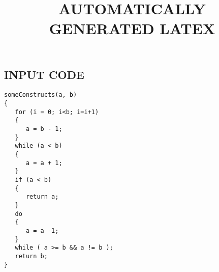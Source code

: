 \documentclass{article}
\begin{document}
\title{AUTOMATICALLY GENERATED LATEX}
\maketitle

\subsection{INPUT CODE}
\begin{lstlisting}
someConstructs(a, b)
{
   for (i = 0; i<b; i=i+1)
   {
      a = b - 1;
   }
   while (a < b)
   {
      a = a + 1;
   }
   if (a < b)
   {
      return a;
   }
   do
   {
      a = a -1;
   }
   while ( a >= b && a != b );
   return b;
}

\end{lstlisting}
\end{document}
